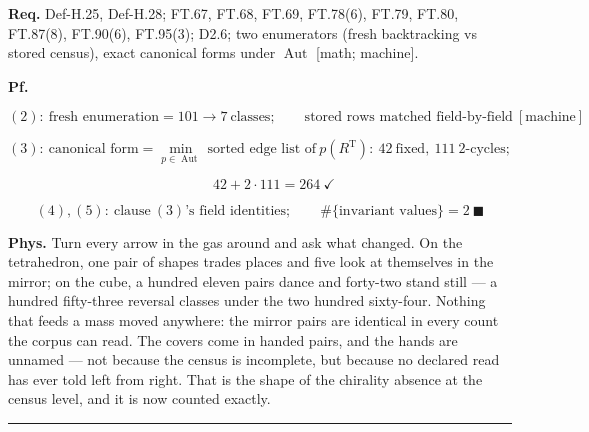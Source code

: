 \begin{theorem}
\textbf{Req.} Def-H.25, Def-H.28; FT.67, FT.68, FT.69, FT.78(6), FT.79, FT.80, FT.87(8), FT.90(6), FT.95(3); D2.6; two enumerators (fresh backtracking vs stored census), exact canonical forms under $\operatorname{Aut}$ [math; machine].

\textbf{Pf.}

\[
(2):\ \text{fresh enumeration}=101\to7\ \text{classes};\qquad\text{stored rows matched field-by-field}\ [\text{machine}]
\]

\[
(3):\ \text{canonical form}=\min_{p\in\operatorname{Aut}}\ \text{sorted edge list of}\ p(R^{\mathrm T}):\ 42\ \text{fixed},\ 111\ \text{2-cycles};
\]

\[
\qquad 42+2\cdot111=264\ \checkmark
\]

\[
(4),(5):\ \text{clause}\ (3)\text{'s field identities};\qquad\#\{\text{invariant values}\}=2\ \blacksquare
\]

\textbf{Phys.} Turn every arrow in the gas around and ask what changed. On the tetrahedron, one pair of shapes trades places and five look at themselves in the mirror; on the cube, a hundred eleven pairs dance and forty-two stand still — a hundred fifty-three reversal classes under the two hundred sixty-four. Nothing that feeds a mass moved anywhere: the mirror pairs are identical in every count the corpus can read. The covers come in handed pairs, and the hands are unnamed — not because the census is incomplete, but because no declared read has ever told left from right. That is the shape of the chirality absence at the census level, and it is now counted exactly.

\vspace{2pt}\noindent\rule{\textwidth}{0.4pt}\vspace{2pt}

\end{theorem}

